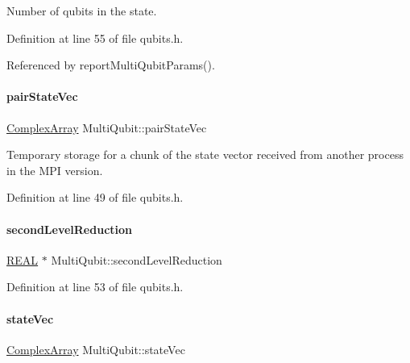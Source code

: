 Number of qubits in the state. 



Definition at line 55 of file qubits.\+h.



Referenced by report\+Multi\+Qubit\+Params().

\mbox{\label{structMultiQubit_a76f7db4eab52d2b30f58f973ada809c5}} 
\paragraph{\texorpdfstring{pair\+State\+Vec}{pairStateVec}}
{\footnotesize\ttfamily \mbox{\hyperlink{structComplexArray}{Complex\+Array}} Multi\+Qubit\+::pair\+State\+Vec}



Temporary storage for a chunk of the state vector received from another process in the M\+PI version. 



Definition at line 49 of file qubits.\+h.

\mbox{\label{structMultiQubit_a3e859cefa146ec7b30464ab3d897930b}} 
\paragraph{\texorpdfstring{second\+Level\+Reduction}{secondLevelReduction}}
{\footnotesize\ttfamily \mbox{\hyperlink{precision_8h_a4b654506f18b8bfd61ad2a29a7e38c25}{R\+E\+AL}} $\ast$ Multi\+Qubit\+::second\+Level\+Reduction}



Definition at line 53 of file qubits.\+h.

\mbox{\label{structMultiQubit_a45483190d6b01ef6b2f98f2bec9ab94f}} 
\paragraph{\texorpdfstring{state\+Vec}{stateVec}}
{\footnotesize\ttfamily \mbox{\hyperlink{structComplexArray}{Complex\+Array}} Multi\+Qubit\+::state\+Vec}



